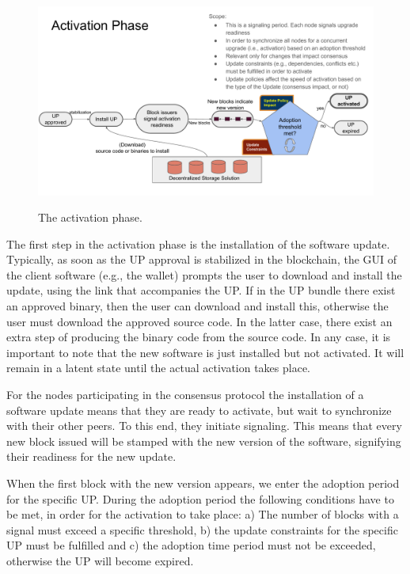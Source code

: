 \begin{figure}[H]
    \caption{The activation phase.}
    \centering
    \includegraphics[width=0.9 \columnwidth,keepaspectratio]{figures/activation_phase.pdf}
    \label{activation}
\end{figure}

The first step in the activation phase is the installation of the software update. Typically, as soon as the UP approval is stabilized in the blockchain, the GUI of the client software (e.g., the wallet) prompts the user to download and install the update, using the link that accompanies the UP. If in the UP bundle there exist an approved binary, then the user can download and install this, otherwise the user must download the approved source code. In the latter case, there exist an extra step of producing the binary code from the source code. In any case, it is important to note that the new software is just installed but not activated. It will remain in a latent state until the actual activation takes place.

For the nodes participating in the consensus protocol the installation of a software update means that they are ready to activate, but wait to synchronize with their other peers. To this end, they initiate signaling. This means that every new block issued will be stamped with the new version of the software, signifying their readiness for the new update.

When the first block with the new version appears, we enter the adoption period for the specific UP. During the adoption period the following conditions have to be met, in order for the activation to take place: a) The number of blocks with a signal must exceed a specific threshold, b) the update constraints for the specific UP must be fulfilled and c) the adoption time period must not be exceeded, otherwise the UP will become expired. 

